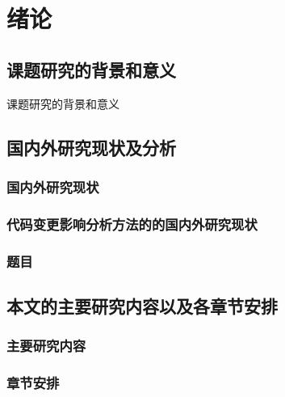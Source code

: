 
\chapter{绪论}

\section{课题研究的背景和意义}


课题研究的背景和意义


\section{国内外研究现状及分析}

\subsection{国内外研究现状}

\subsection{代码变更影响分析方法的的国内外研究现状}

\subsection{题目}

\section{本文的主要研究内容以及各章节安排}
\subsection{主要研究内容}
\subsection{章节安排}



